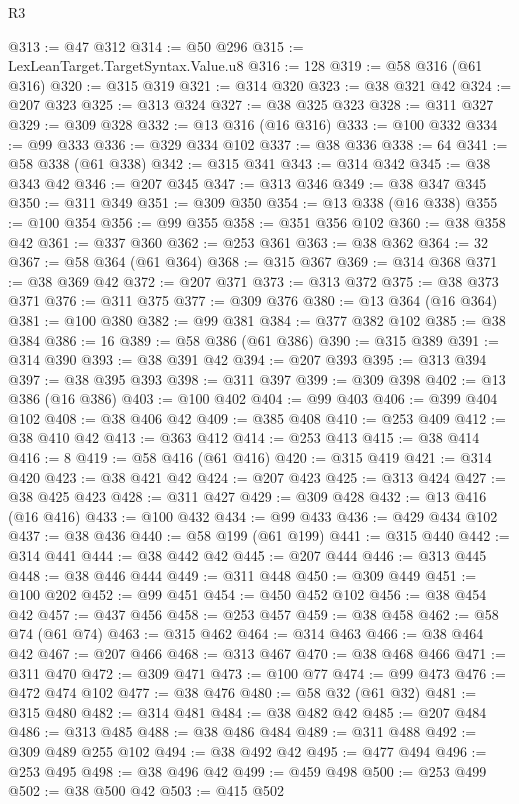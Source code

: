 \begin{lexlean}{R3}
\begin{coremodule}
@313 := @47 @312
@314 := @50 @296
@315 := LexLeanTarget.TargetSyntax.Value.u8
@316 := 128
@319 := @58 @316 (@61 @316)
@320 := @315 @319
@321 := @314 @320
@323 := @38 @321 @42
@324 := @207 @323
@325 := @313 @324
@327 := @38 @325 @323
@328 := @311 @327
@329 := @309 @328
@332 := @13 @316 (@16 @316)
@333 := @100 @332
@334 := @99 @333
@336 := @329 @334 @102
@337 := @38 @336
@338 := 64
@341 := @58 @338 (@61 @338)
@342 := @315 @341
@343 := @314 @342
@345 := @38 @343 @42
@346 := @207 @345
@347 := @313 @346
@349 := @38 @347 @345
@350 := @311 @349
@351 := @309 @350
@354 := @13 @338 (@16 @338)
@355 := @100 @354
@356 := @99 @355
@358 := @351 @356 @102
@360 := @38 @358 @42
@361 := @337 @360
@362 := @253 @361
@363 := @38 @362
@364 := 32
@367 := @58 @364 (@61 @364)
@368 := @315 @367
@369 := @314 @368
@371 := @38 @369 @42
@372 := @207 @371
@373 := @313 @372
@375 := @38 @373 @371
@376 := @311 @375
@377 := @309 @376
@380 := @13 @364 (@16 @364)
@381 := @100 @380
@382 := @99 @381
@384 := @377 @382 @102
@385 := @38 @384
@386 := 16
@389 := @58 @386 (@61 @386)
@390 := @315 @389
@391 := @314 @390
@393 := @38 @391 @42
@394 := @207 @393
@395 := @313 @394
@397 := @38 @395 @393
@398 := @311 @397
@399 := @309 @398
@402 := @13 @386 (@16 @386)
@403 := @100 @402
@404 := @99 @403
@406 := @399 @404 @102
@408 := @38 @406 @42
@409 := @385 @408
@410 := @253 @409
@412 := @38 @410 @42
@413 := @363 @412
@414 := @253 @413
@415 := @38 @414
@416 := 8
@419 := @58 @416 (@61 @416)
@420 := @315 @419
@421 := @314 @420
@423 := @38 @421 @42
@424 := @207 @423
@425 := @313 @424
@427 := @38 @425 @423
@428 := @311 @427
@429 := @309 @428
@432 := @13 @416 (@16 @416)
@433 := @100 @432
@434 := @99 @433
@436 := @429 @434 @102
@437 := @38 @436
@440 := @58 @199 (@61 @199)
@441 := @315 @440
@442 := @314 @441
@444 := @38 @442 @42
@445 := @207 @444
@446 := @313 @445
@448 := @38 @446 @444
@449 := @311 @448
@450 := @309 @449
@451 := @100 @202
@452 := @99 @451
@454 := @450 @452 @102
@456 := @38 @454 @42
@457 := @437 @456
@458 := @253 @457
@459 := @38 @458
@462 := @58 @74 (@61 @74)
@463 := @315 @462
@464 := @314 @463
@466 := @38 @464 @42
@467 := @207 @466
@468 := @313 @467
@470 := @38 @468 @466
@471 := @311 @470
@472 := @309 @471
@473 := @100 @77
@474 := @99 @473
@476 := @472 @474 @102
@477 := @38 @476
@480 := @58 @32 (@61 @32)
@481 := @315 @480
@482 := @314 @481
@484 := @38 @482 @42
@485 := @207 @484
@486 := @313 @485
@488 := @38 @486 @484
@489 := @311 @488
@492 := @309 @489 @255 @102
@494 := @38 @492 @42
@495 := @477 @494
@496 := @253 @495
@498 := @38 @496 @42
@499 := @459 @498
@500 := @253 @499
@502 := @38 @500 @42
@503 := @415 @502

\end{coremodule}
\end{lexlean}
